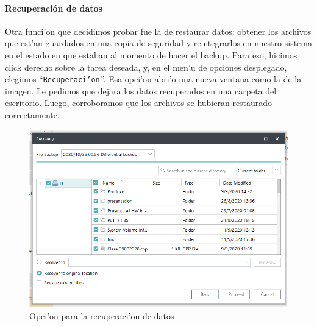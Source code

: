 \documentclass[11pt]{article}
\begin{document}
    \paragraph{Recuperaci\'on de datos}
    Otra funci'on que decidimos probar fue la de restaurar datos: obtener los archivos que est'an guardados en una copia de seguridad y reintegrarlos en nuestro sistema en el estado en que estaban al momento de hacer el backup. Para eso, hicimos click derecho sobre la tarea deseada, y, en el men'u de opciones desplegado, elegimos ``\texttt{Recuperaci'on}’’. Esa opci'on abri'o una nueva ventana como la de la imagen. Le pedimos que dejara los datos recuperados en una carpeta del escritorio. Luego, corroboramos que los archivos se hubieran restaurado correctamente.

    \begin{figure}[H]
		\centering
		\includegraphics[width=.8\textwidth]{Images/easeus/pendrive/13-rec_1.png}
		\caption{Opci'on para la recuperaci'on de datos}
	\end{figure}
	
\end{document}
